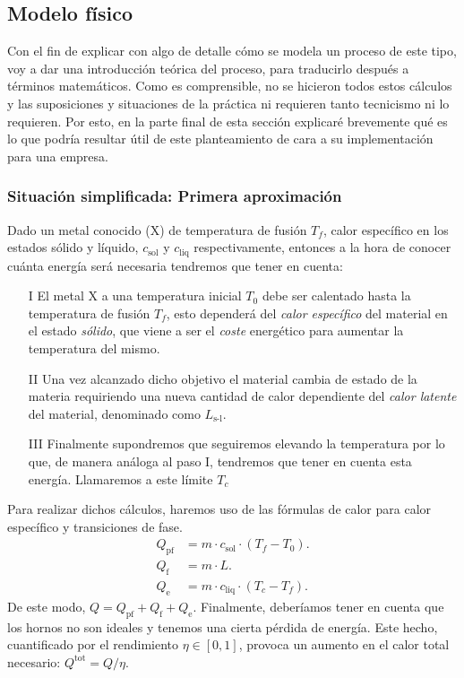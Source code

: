 \subsection{Modelo físico}
%
%
Con el fin de explicar con algo de detalle cómo se modela un proceso de este tipo, voy a dar una introducción teórica del proceso, para traducirlo después a términos matemáticos. Como es comprensible, no se hicieron todos estos cálculos y las suposiciones y situaciones de la práctica ni requieren tanto tecnicismo ni lo requieren. Por esto, en la parte final de esta sección explicaré brevemente qué es lo que podría resultar útil de este planteamiento de cara a su implementación para una empresa.
%
%
%
\subsubsection{Situación simplificada: Primera aproximación} \label{PrimeraAproximacion}
%
%
%
Dado un metal conocido (X) de temperatura de fusión $T_f$, calor específico en los estados sólido y líquido, $c_{\text{sol}}$ y $c_{\text{liq}}$ respectivamente, entonces a la hora de conocer cuánta energía será necesaria tendremos que tener en cuenta:
\begin{itemize}
    \item[I] El metal X a una temperatura inicial $T_0$ debe ser calentado hasta la temperatura de fusión $T_f$, esto dependerá del \textit{calor específico} del material en el estado \textit{sólido}, que viene a ser el \textit{coste} energético para aumentar la temperatura del mismo.
    \item[II] Una vez alcanzado dicho objetivo el material cambia de estado de la materia requiriendo una nueva cantidad de calor dependiente del \textit{calor latente} del material, denominado como $L_{\text{s-l}}$.
    \item[III] Finalmente supondremos que seguiremos elevando la temperatura por lo que, de manera análoga al paso I, tendremos que tener en cuenta esta energía. Llamaremos a este límite $T_c$
\end{itemize}
Para realizar dichos cálculos, haremos uso de las fórmulas de calor para calor específico y transiciones de fase.
\begin{align}
    Q_{\text{pf}} &= m \cdot c_{\text{sol}} \cdot (T_f-T_0).\\
    Q_{\text{f}} &= m \cdot L.\\
    Q_{\text{e}} &= m \cdot c_{\text{liq}} \cdot (T_c-T_f).
\end{align}
De este modo, $Q = Q_{\text{pf}} + Q_{\text{f}} + Q_{\text{e}}$. Finalmente, deberíamos tener en cuenta que los hornos no son ideales y tenemos una cierta pérdida de energía. Este hecho, cuantificado por el rendimiento $\eta \in [0,1]$, provoca un aumento en el calor total necesario: $Q^{\text{tot}} = Q/\eta$.

